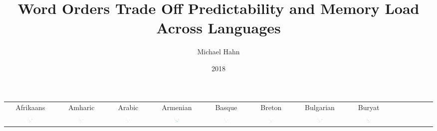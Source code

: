\documentclass[8pt,letterpaper]{article}
\title{Word Orders Trade Off Predictability and Memory Load Across Languages}%
\author{Michael Hahn}
\date{2018}
\begin{document}
\maketitle


\begin{tabular}{cccccccccccccc}
Afrikaans & Amharic & Arabic & Armenian & Basque & Breton & Bulgarian & Buryat \\
\includegraphics[width=0.12\textwidth]{figures/Afrikaans-listener-surprisal-memory.pdf} & \includegraphics[width=0.12\textwidth]{figures/Amharic-Adap-listener-surprisal-memory.pdf} & \includegraphics[width=0.12\textwidth]{figures/Arabic-listener-surprisal-memory.pdf} & \includegraphics[width=0.12\textwidth]{figures/Armenian-Adap-listener-surprisal-memory.pdf} & \includegraphics[width=0.12\textwidth]{figures/Basque-listener-surprisal-memory.pdf} & \includegraphics[width=0.12\textwidth]{figures/Breton-Adap-listener-surprisal-memory.pdf} & \includegraphics[width=0.12\textwidth]{figures/Bulgarian-listener-surprisal-memory.pdf} & \includegraphics[width=0.12\textwidth]{figures/Buryat-Adap-listener-surprisal-memory.pdf}

\end{tabular}
\end{document}
